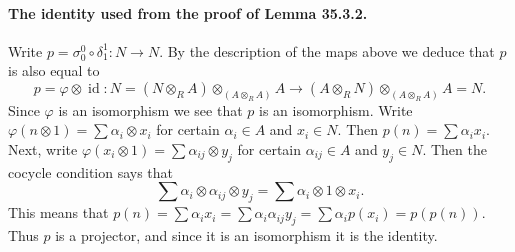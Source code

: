 \documentclass[UTF8,11pt]{ctexart}
\theoremstyle{definition}
\DeclareMathOperator{\id}{id}
\begin{document}
\paragraph{The identity used from the proof of Lemma 35.3.2.}
Write $p=\sigma^0_0\circ\delta^1_1:N\to N$. By the description of the maps above we deduce that $p$ is also equal to
\[
p=\varphi\otimes\id:N=(N\otimes_R A)\otimes_{(A\otimes_R A)}A
\longrightarrow(A\otimes_R N)\otimes_{(A\otimes_R A)}A=N.
\]
Since $\varphi$ is an isomorphism we see that $p$ is an isomorphism. Write $\varphi(n\otimes1)=\sum\alpha_i\otimes x_i$ for certain $\alpha_i\in A$ and $x_i\in N$. Then $p(n)=\sum\alpha_i x_i$. Next, write $\varphi(x_i\otimes1)=\sum\alpha_{ij}\otimes y_j$ for certain $\alpha_{ij}\in A$ and $y_j\in N$. Then the cocycle condition says that
\[
\sum\alpha_i\otimes\alpha_{ij}\otimes y_j=\sum\alpha_i\otimes1\otimes x_i.
\]
This means that $p(n)=\sum\alpha_i x_i=\sum\alpha_i\alpha_{ij}y_j=\sum\alpha_i p(x_i)=p(p(n))$. Thus $p$ is a projector, and since it is an isomorphism it is the identity.
\end{document}
